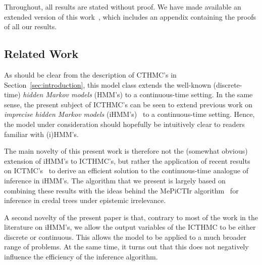 \documentclass[twoside,11pt]{article}
\begin{document}
Throughout, all results are stated without proof. We have made available an extended version of this work~\citep{krak2017icthmc}, which includes an appendix containing the proofs of all our results.


\subsection{Related Work}\label{sec:related}

As should be clear from the description of CTHMC's in Section~\ref{sec:introduction}, this model class extends the well-known (discrete-time) \emph{hidden Markov models} (HMM's) to a continuous-time setting. In the same sense, the present subject of ICTHMC's can be seen to extend previous work on \emph{imprecise hidden Markov models} (iHMM's)~\citep{deCooman:2010gd} to a continuous-time setting. Hence, the model  under consideration should hopefully be intuitively clear to readers familiar with (i)HMM's. 

The main novelty of this present work is therefore not the (somewhat obvious) extension of iHMM's to ICTHMC's, but rather the application of recent results on ICTMC's~\citep{krak2016ictmc} to derive an efficient solution to the continuous-time analogue of inference in iHMM's. The algorithm that we present is largely based on combining these results with the ideas behind the MePiCTIr algorithm~\citep{deCooman:2010gd} for inference in credal trees under epistemic irrelevance.

A second novelty of the present paper is that, contrary to most of the work in the literature on iHMM's, we allow the output variables of the ICTHMC to be either discrete or continuous. This allows the model to be applied to a much broader range of problems. At the same time, it turns out that this does not negatively influence the efficiency of the inference algorithm.
\end{document}
